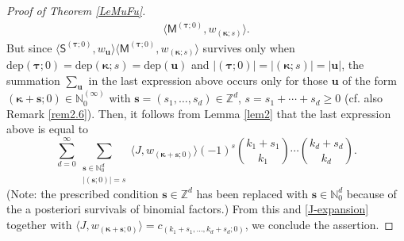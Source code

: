 \documentclass[ALCO,Unicode,published]{cedram}
\def\MM{{\mathsf{M}}}
\def\SS{{\mathsf{S}}}
\def\dep{\mathrm{dep}}
\def\bs{{\mathbf{s}}}
\def\bu{{\mathbf{u}}}
\def\bkappa{{\boldsymbol \kappa}}
\def\btau{{\boldsymbol \tau}}
\def\lp{\langle}
\def\rp{\rangle}
\def\N{{\mathbb N}}
\def\Z{{\mathbb Z}}
\def\bkappa{{\boldsymbol \kappa}}
\begin{document}
\begin{proof}[Proof of Theorem \ref{LeMuFu}]
\begin{align*}
\lp \MM^{(\btau;0)}, w_{(\bkappa;s)} \rp .
\end{align*}
But since $\lp\SS^{(\btau;0)},w_\bu\rp \lp \MM^{(\btau;0)}, w_{(\bkappa;s)} \rp$ 
survives only when 
$\dep(\btau;0)=\dep(\bkappa;s)=\dep(\bu)$ and $|(\btau;0)|=|(\bkappa;s)|=|\bu|$,
the summation $\sum_\bu$ in the last expression above occurs only for 
those $\bu$ of the form 
$(\bkappa+\bs;0)\in \N_0^{(\infty)}$ 
with $\bs=(s_1,\dots,s_d)\in\Z^d$, 
$s=s_1+\cdots+s_d\ge 0$
(cf. also Remark \ref{rem2.6}).  
Then, it follows from Lemma \ref{lem2} that the last expression above is equal to 
$$
\sum_{d=0}^\infty \sum_{\substack{\bs\in\N_0^d \\ |(\bs;0)|=s}} 
\lp J, w_{(\bkappa+\bs;0)} \rp
(-1)^s
\binom{k_1+s_1}{k_1}\cdots \binom{k_d+s_d}{k_d}.
$$
(Note: the prescribed condition $\bs\in\Z^d$ has been replaced 
with $\bs\in\N_0^d$ because of the a posteriori survivals of binomial factors.)
From this and \eqref{J-expansion} together with
$\lp J, w_{(\bkappa+\bs;0)} \rp=c_{(k_1+s_1,\dots,k_d+s_d;0)}$, 
we conclude the assertion.
\end{proof}
\end{document}
